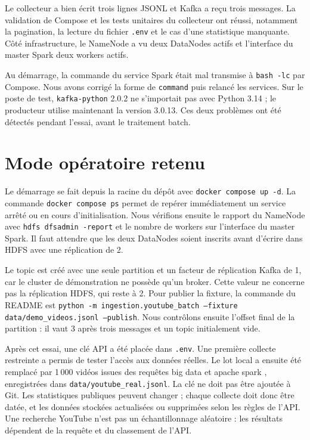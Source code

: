 \documentclass[11pt,a4paper]{article}
\begin{document}
Le collecteur a bien écrit trois lignes JSONL et Kafka a reçu trois messages. La validation de Compose et les tests unitaires du collecteur ont réussi, notamment la pagination, la lecture du fichier \texttt{.env} et le cas d'une statistique manquante. Côté infrastructure, le NameNode a vu deux DataNodes actifs et l'interface du master Spark deux workers actifs.

Au démarrage, la commande du service Spark était mal transmise à \texttt{bash -lc} par Compose. Nous avons corrigé la forme de \texttt{command} puis relancé les services. Sur le poste de test, \texttt{kafka-python} 2.0.2 ne s'importait pas avec Python 3.14 ; le producteur utilise maintenant la version 3.0.13. Ces deux problèmes ont été détectés pendant l'essai, avant le traitement batch.

\section{Mode opératoire retenu}

Le démarrage se fait depuis la racine du dépôt avec \texttt{docker compose up -d}. La commande \texttt{docker compose ps} permet de repérer immédiatement un service arrêté ou en cours d'initialisation. Nous vérifions ensuite le rapport du NameNode avec \texttt{hdfs dfsadmin -report} et le nombre de workers sur l'interface du master Spark. Il faut attendre que les deux DataNodes soient inscrits avant d'écrire dans HDFS avec une réplication de 2.

Le topic est créé avec une seule partition et un facteur de réplication Kafka de 1, car le cluster de démonstration ne possède qu'un broker. Cette valeur ne concerne pas la réplication HDFS, qui reste à 2. Pour publier la fixture, la commande du README est \texttt{python -m ingestion.youtube\_batch --fixture data/demo\_videos.jsonl --publish}. Nous contrôlons ensuite l'offset final de la partition : il vaut 3 après trois messages et un topic initialement vide.

Après cet essai, une clé API a été placée dans \texttt{.env}. Une première collecte restreinte a permis de tester l'accès aux données réelles. Le lot local a ensuite été remplacé par 1\,000 vidéos issues des requêtes \og big data \fg{} et \og apache spark \fg{}, enregistrées dans \texttt{data/youtube\_real.jsonl}. La clé ne doit pas être ajoutée à Git. Les statistiques publiques peuvent changer ; chaque collecte doit donc être datée, et les données stockées actualisées ou supprimées selon les règles de l'API. Une recherche YouTube n'est pas un échantillonnage aléatoire : les résultats dépendent de la requête et du classement de l'API.
\end{document}
